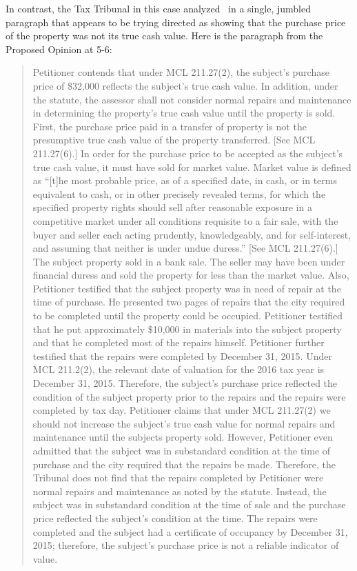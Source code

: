 \documentclass[12pt,\documentclassflag]{michiganCourtOfAppealsBrief}
\def\mathieuGast{\pincite[l]{MCL}{211.27(2)}}
\begin{document}
In contrast, the Tax Tribunal in this case analyzed \mathieuGast\ in a single, jumbled paragraph that appears to be trying directed as showing that the purchase price of the property was not its true cash value. Here is the paragraph from the Proposed Opinion at 5-6:

\begin{quote} Petitioner contends that under MCL 211.27(2), the subject’s purchase price of \$32,000 reflects the subject’s true cash value. In addition, under the statute, the assessor shall not consider normal repairs and maintenance in determining the property’s true cash value until the property is sold. First, the purchase price paid in a transfer of property is not the presumptive true cash value of the property transferred. [See MCL 211.27(6).] In order for the purchase price to be accepted as the subject’s true cash value, it must have sold for market value. Market value is defined as ``[t]he most probable price, as of a specified date, in cash, or in terms equivalent to cash, or in other precisely revealed terms, for which the specified property rights should sell after reasonable exposure in a competitive market under all conditions requisite to a fair sale, with the buyer and seller each acting prudently, knowledgeably, and for self-interest, and assuming that neither is under undue duress.'' [See MCL 211.27(6).] The subject property sold in a bank sale. The seller may have been under financial duress and sold the property for less than the market value. Also, Petitioner testified that the subject property was in need of repair at the time of purchase. He presented two pages of repairs that the city required to be completed until the property could be occupied. Petitioner testified that he put approximately \$10,000 in materials into the subject property and that he completed most of the repairs himself. Petitioner further testified that the repairs were completed by December 31, 2015. Under MCL 211.2(2), the relevant date of valuation for the 2016 tax year is December 31, 2015. Therefore, the subject’s purchase price reflected the condition of the subject property prior to the repairs and the repairs were completed by tax day. Petitioner claims that under MCL 211.27(2) we should not increase the subject’s true cash value for normal repairs and maintenance until the subjects property sold. However, Petitioner even admitted that the subject was in substandard condition at the time of purchase and the city required that the repairs be made. Therefore, the Tribunal does not find that the repairs completed by Petitioner were normal repairs and maintenance as noted by the statute. Instead, the subject was in substandard condition at the time of sale and the purchase price reflected the subject’s condition at the time. The repairs were completed and the subject had a certificate of occupancy by December 31, 2015; therefore, the subject’s purchase price is not a reliable indicator of value. 
\end{quote}
\end{document}
